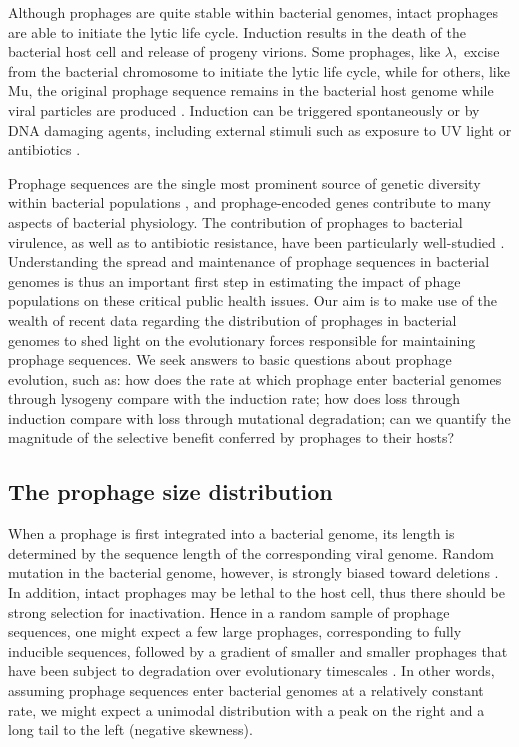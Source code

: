  Although prophages are quite stable within bacterial genomes, intact prophages are able to initiate the lytic life cycle.
 Induction results in the death of the bacterial host cell and release of progeny virions. Some prophages, like $\lambda,$ excise from the bacterial chromosome to initiate the lytic life cycle, while for others, like Mu, the original prophage sequence remains in the bacterial host genome while viral particles are produced \citep{shapiro_molecular_1979}. Induction can be triggered spontaneously \citep {fothergill_effect_2011, james_differential_2012} or by DNA damaging agents, including external stimuli such as exposure to UV light or antibiotics \citep {barnhart_prophage_1976, lopez_induction_2014}. 

 Prophage sequences are the single most prominent 
 source of genetic diversity within bacterial populations \citep{fortier_importance_2013}, and  prophage-encoded genes contribute to many aspects of bacterial physiology. The contribution of prophages to bacterial virulence, as well as to antibiotic resistance, have been particularly well-studied \citep{wagner_bacteriophage_2002,fortier_importance_2013, haaber_bacterial_2016}. 
Understanding the spread and maintenance of prophage sequences in bacterial genomes is thus an important first step in estimating the impact of phage populations on these critical public health issues.  Our aim is to make use of the wealth of recent data
 regarding the distribution of prophages in bacterial genomes to shed light on the evolutionary forces responsible for maintaining prophage sequences.  We seek answers to basic questions about prophage evolution, such as: how does the rate at which prophage enter bacterial genomes through lysogeny compare with the induction rate; how does loss through induction compare with loss through mutational degradation; can we quantify the magnitude of the selective benefit conferred by prophages to their hosts?

\subsection{The prophage size distribution} \label{psd}
 When a prophage is first integrated into a bacterial genome, its length is determined by the sequence length of the corresponding viral genome. 
 Random mutation in the bacterial genome, however, is strongly biased toward deletions \citep{kuo_deletional_2009,mira_deletional_2001, danneels_patterns_2018}.  In addition, intact prophages may be lethal to the host cell, thus there should be strong selection for inactivation. Hence in a random sample of prophage sequences, one might expect a few large prophages, corresponding to fully inducible sequences, followed by a gradient of smaller and smaller prophages that have been subject to degradation over evolutionary timescales \citep{bobay_pervasive_2014}. In other words, assuming prophage sequences enter bacterial genomes at a relatively constant rate, we might expect a unimodal distribution with a peak on the right and a long tail to the left (negative skewness).
 
